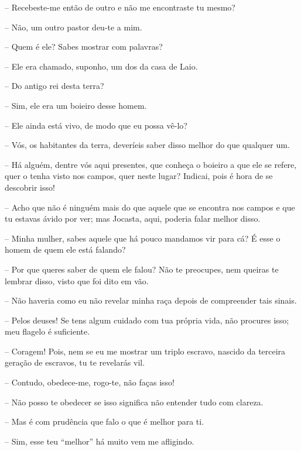  --   Recebeste-me então de outro e não me encontraste tu mesmo?

 --    Não, um outro pastor deu-te a mim.

 --   Quem é ele? Sabes mostrar com palavras?

 --   Ele era chamado, suponho, um dos da casa de Laio.

 --   Do antigo rei desta terra?

 --   Sim, ele era um boieiro desse homem.

 --   Ele ainda está vivo, de modo que eu possa vê-lo?

 --   Vós, os habitantes da terra, deveríeis saber disso melhor do que
qualquer um.

 --   Há alguém, dentre vós aqui presentes, que conheça o boieiro a que ele se
refere,  quer o tenha visto nos campos, quer neste lugar? Indicai,
pois é hora de se descobrir isso!

 --   Acho que não é ninguém mais do que aquele que se encontra nos campos e
que tu estavas ávido por ver; mas Jocasta, aqui, poderia falar melhor
disso.

 --   Minha mulher, sabes aquele que há pouco mandamos vir para cá? É esse o
homem de quem ele está falando?

 --   Por que queres saber de quem ele falou? Não te preocupes, nem queiras te
lembrar disso, visto que foi dito em vão.

 --   Não haveria como eu não revelar minha raça depois de compreender tais
sinais.

 --    Pelos deuses! Se tens algum cuidado com tua própria vida, não
procures isso; meu flagelo é suficiente.

 --   Coragem! Pois, nem se eu me mostrar um triplo escravo, nascido da
terceira geração de escravos, tu te revelarás vil.

 --   Contudo, obedece-me, rogo-te, não faças isso!

 --   Não posso te obedecer se isso significa não entender tudo com clareza.

 --   Mas é com prudência que falo o que é melhor para ti.

 --   Sim, esse teu ``melhor'' há muito vem me afligindo.

